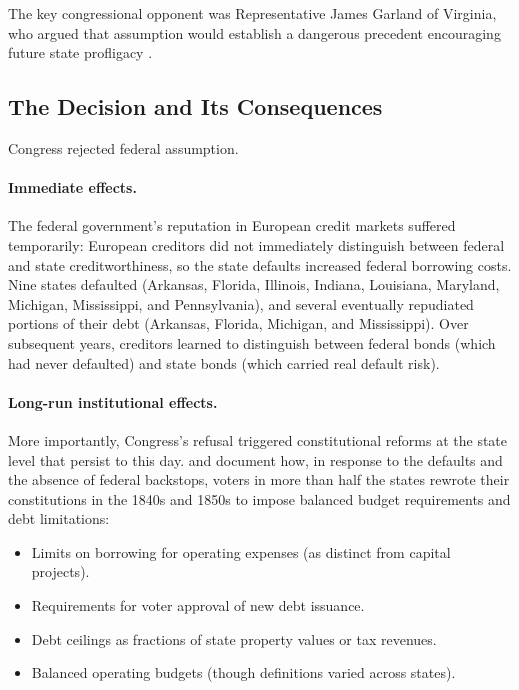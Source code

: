 \documentclass[12pt]{article}
\begin{document}
The key congressional opponent was Representative James Garland of
Virginia, who argued that assumption would establish a dangerous
precedent encouraging future state profligacy
\citep[ch.~9]{McGrane1935}.

\subsection{The Decision and Its Consequences}

Congress rejected federal assumption.

\paragraph{Immediate effects.}
The federal government's reputation in European credit markets suffered
temporarily: European creditors did not immediately distinguish between
federal and state creditworthiness, so the state defaults increased
federal borrowing costs. Nine states defaulted (Arkansas, Florida,
Illinois, Indiana, Louisiana, Maryland, Michigan, Mississippi, and
Pennsylvania), and several eventually repudiated portions of their debt
(Arkansas, Florida, Michigan, and Mississippi). Over subsequent years,
creditors learned to distinguish between federal bonds (which had never
defaulted) and state bonds (which carried real default risk).

\paragraph{Long-run institutional effects.}
More importantly, Congress's refusal triggered constitutional reforms at
the state level that persist to this day. \citet{Adams1887} and
\citet{Wallis2005} document how, in response to the defaults and the
absence of federal backstops, voters in more than half the states rewrote
their constitutions in the 1840s and 1850s to impose balanced budget
requirements and debt limitations:

\begin{itemize}
\item Limits on borrowing for operating expenses (as distinct from
  capital projects).
\item Requirements for voter approval of new debt issuance.
\item Debt ceilings as fractions of state property values or tax
  revenues.
\item Balanced operating budgets (though definitions varied across
  states).
\end{itemize}
\end{document}
